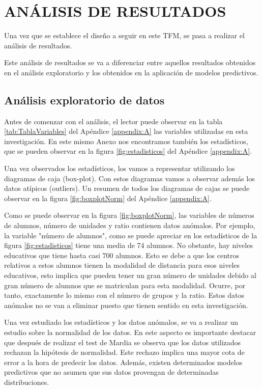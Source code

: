 \chapter{ANÁLISIS DE RESULTADOS}
Una vez que se establece el diseño a seguir en este TFM, se pasa a realizar el análisis de resultados.

Este análisis de resultados se va a diferenciar entre aquellos resultados obtenidos en el análisis exploratorio y los obtenidos en la aplicación de modelos predictivos.

\section{Análisis exploratorio de datos}

Antes de comenzar con el análisis, el lector puede observar en la tabla \ref{tab:TablaVariables} del Apéndice \ref{appendix:A} las variables utilizadas en esta investigación. En este mismo Anexo nos encontramos también los estadísticos, que se pueden observar en la figura \ref{fig:estadisticos} del Apéndice \ref{appendix:A}.
 
Una vez observados los estadísticos, los vamos a representar utilizando los diagramas de caja (box-plot). Con estos diagramas vamos a observar además los datos atípicos (outliers). Un resumen de todos los diagramas de cajas se puede observar en la figura \ref{fig:boxplotNorm} del Apéndice \ref{appendix:A}. 

Como se puede observar en la figura \ref{fig:boxplotNorm}, las variables de números de alumnos, número de unidades y ratio contienen datos anómalos. Por ejemplo, la variable "número de alumnos", como se puede apreciar en los estadísticos de la figura \ref{fig:estadisticos} tiene una media de 74 alumnos. No obstante, hay niveles educativos que tiene hasta casi 700 alumnos. Esto se debe a que los centros relativos a estos alumnos tienen la modalidad de distancia para esos niveles educativos, esto implica que pueden tener un gran número de unidades debido al gran número de alumnos que se matriculan para esta modalidad. Ocurre, por tanto, exactamente lo mismo con el número de grupos y la ratio. Estos datos anómalos no se van a eliminar puesto que tienen sentido en esta investigación.

Una vez estudiado los estadísticos y los datos anómalos, se va a realizar un estudio sobre la normalidad de los datos. En este aspecto es importante destacar que después de realizar el test de Mardia se observa que los datos utilizados rechazan la hipótesis de normalidad. Este rechazo implica una mayor cota de error a la hora de predecir los datos. Además, existen determinados modelos predictivos que no asumen que sus datos provengan de determinadas distribuciones.

